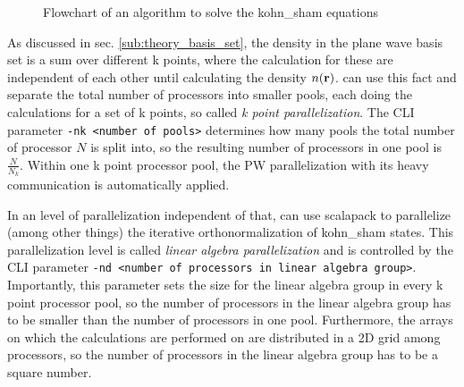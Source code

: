 \documentclass[main.tex]{subfiles}
\begin{document}
\begin{wrapfigure}{l}{0.5\textwidth}
\centering
{}
\label{fig:diagram_scf_calculations}
\caption{Flowchart of an algorithm to solve the \acrshort{kohn_sham} equations}
\end{wrapfigure}

As discussed in sec. \ref{sub:theory_basis_set}, the density in the plane wave basis set is a sum over different k points, where the calculation for these are independent of each other until calculating the density \(n( \vb{r})\).
\QE can use this fact and separate the total number of processors into smaller pools, each doing the calculations for a set of k points, so called \emph{k point parallelization}.
The CLI parameter \texttt{-nk <number of pools>} determines how many pools the total number of processor \(N\) is split into, so the resulting number of processors in one pool is \(\frac{N}{N_k}\).
Within one k point processor pool, the PW parallelization with its heavy communication is automatically applied.

In an level of parallelization independent of that, \QE can use \gls{scalapack} to parallelize (among other things) the iterative orthonormalization of \acrshort{kohn_sham} states.
This parallelization level is called \emph{linear algebra parallelization} and is controlled by the CLI parameter \texttt{-nd <number of processors in linear algebra group>}.
Importantly, this parameter sets the size for the linear algebra group in every k point processor pool, so the number of processors in the linear algebra group has to be smaller than the number of processors in one pool.
Furthermore, the arrays on which the calculations are performed on are distributed in a 2D grid among processors, so the number of processors in the linear algebra group has to be a square number.
\end{document}
